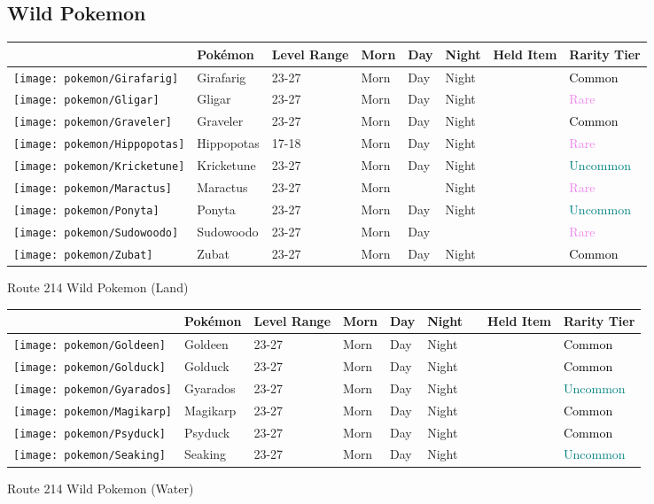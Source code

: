 \subsection{Wild Pokemon}%
\label{subsec:WildPokemon}%
\begin{longtable}{||l l l l l l l l||}%
\hline%
&Pokémon&Level Range&Morn&Day&Night&Held Item&Rarity Tier\\%
\hline%
\endhead%
\hline%
\texttt{[image: pokemon/Girafarig]}&Girafarig&23{-}27&Morn&Day&Night&&\textcolor{black}{%
Common%
}\\%
\hline%
\texttt{[image: pokemon/Gligar]}&Gligar&23{-}27&Morn&Day&Night&&\textcolor{violet}{%
Rare%
}\\%
\hline%
\texttt{[image: pokemon/Graveler]}&Graveler&23{-}27&Morn&Day&Night&&\textcolor{black}{%
Common%
}\\%
\hline%
\texttt{[image: pokemon/Hippopotas]}&Hippopotas&17{-}18&Morn&Day&Night&&\textcolor{violet}{%
Rare%
}\\%
\hline%
\texttt{[image: pokemon/Kricketune]}&Kricketune&23{-}27&Morn&Day&Night&&\textcolor{teal}{%
Uncommon%
}\\%
\hline%
\texttt{[image: pokemon/Maractus]}&Maractus&23{-}27&Morn&&Night&&\textcolor{violet}{%
Rare%
}\\%
\hline%
\texttt{[image: pokemon/Ponyta]}&Ponyta&23{-}27&Morn&Day&Night&&\textcolor{teal}{%
Uncommon%
}\\%
\hline%
\texttt{[image: pokemon/Sudowoodo]}&Sudowoodo&23{-}27&Morn&Day&&&\textcolor{violet}{%
Rare%
}\\%
\hline%
\texttt{[image: pokemon/Zubat]}&Zubat&23{-}27&Morn&Day&Night&&\textcolor{black}{%
Common%
}\\%
\hline%
\end{longtable}%
\caption{Route 214 Wild Pokemon (Land)}%
\begin{longtable}{||l l l l l l l l l||}%
\hline%
&Pokémon&Level Range&Morn&Day&Night&&Held Item&Rarity Tier\\%
\hline%
\endhead%
\hline%
\texttt{[image: pokemon/Goldeen]}&Goldeen&23{-}27&Morn&Day&Night&&&\textcolor{black}{%
Common%
}\\%
\hline%
\texttt{[image: pokemon/Golduck]}&Golduck&23{-}27&Morn&Day&Night&&&\textcolor{black}{%
Common%
}\\%
\hline%
\texttt{[image: pokemon/Gyarados]}&Gyarados&23{-}27&Morn&Day&Night&&&\textcolor{teal}{%
Uncommon%
}\\%
\hline%
\texttt{[image: pokemon/Magikarp]}&Magikarp&23{-}27&Morn&Day&Night&&&\textcolor{black}{%
Common%
}\\%
\hline%
\texttt{[image: pokemon/Psyduck]}&Psyduck&23{-}27&Morn&Day&Night&&&\textcolor{black}{%
Common%
}\\%
\hline%
\texttt{[image: pokemon/Seaking]}&Seaking&23{-}27&Morn&Day&Night&&&\textcolor{teal}{%
Uncommon%
}\\%
\hline%
\end{longtable}%
\caption{Route 214 Wild Pokemon (Water)}